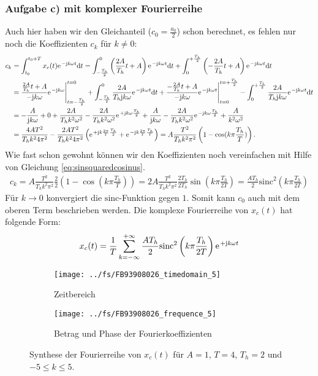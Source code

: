 \documentclass[11pt,a4paper,DIV=12]{scrartcl}
\newcommand{\sinc}{\mathrm{sinc}}
\begin{document}
\subsubsection{Aufgabe c) mit komplexer Fourierreihe}
%
Auch hier haben wir den Gleichanteil ($c_0=\frac{a_0}{2}$) schon berechnet,
es fehlen nur noch die Koeffizienten $c_k$ für $k\neq 0$:
%
%
%
\begin{align}
	c_k&=\int_{t_0}^{t_0+T}x_{c}(t)\e^{-\im k \omega t}\diff t
	=\int_{-\frac{T_h}{2}}^0\left (\frac{2A}{T_h}t+A\right )\e^{-\im k \omega t}\diff t+\int_0^{+\frac{T_h}{2}}\left (-\frac{2A}{T_h}t+A\right )\e^{-\im k \omega t}\diff t\nonumber \\
	&= \frac{\frac{2A}{T_h}t+A}{-\im k \omega}\e^{-\im k \omega}\Bigg|_{t=-\frac{T_h}{2}}^{t=0}+\int_{-\frac{T_h}{2}}^0\frac{2A}{T_h\im k\omega}\e^{-\im k \omega t}\diff t+\frac{-\frac{2A}{T_h}t+A}{-\im k \omega}\e^{-\im k \omega t}\Bigg |_{t=0}^{t=+\frac{T_h}{2}}-\int_0^{+\frac{T_h}{2}}\frac{2A}{T_h\im k\omega}\e^{-\im k \omega t}\diff t\nonumber \\
	&=-\frac{A}{\im k \omega}+0+\frac{2A}{T_h k^2\omega^2}-\frac{2A}{T_hk^2\omega^2}\e^{+\im k \omega \frac{T_h}{2}}+\frac{A}{\im k \omega}-\frac{2A}{T_hk^2\omega^2}\e^{-\im k \omega \frac{T_h}{2}}+\frac{A}{k^2\omega^2}\nonumber \\
	&=\frac{4AT^2}{T_hk^24\pi^2}-\frac{2AT^2}{T_hk^24\pi^2}\left (\e^{+\im k \frac{2\pi}{T}\frac{T_h}{2}}+\e^{-\im k\frac{2\pi}{T}\frac{T_h}{T}}\right )
	=A\frac{T^2}{T_hk^2\pi^2}\left (1-\cos(k\pi\frac{T_h}{T})\right ).
\end{align}
%
%
%
Wie fast schon gewohnt können wir den Koeffizienten noch vereinfachen
mit Hilfe von Gleichung \ref{eq:sinsquaredcosinus}.
%
%
\begin{gather}
	c_k=A\frac{T^2}{T_hk^2\pi^2}\frac{2}{2}\left (1-\cos(k\pi\frac{T_h}{T})\right )
	=2A\frac{T^2}{T_hk^2\pi^2}\frac{2T_h}{2T_h}\sin\left(k\pi\frac{T_h}{2T}\right)
	=\frac{AT_h}{2}\sinc^2\left(k\pi\frac{T_h}{2T}\right)
\end{gather}
%
%
Für $k\rightarrow0$ konvergiert die $\sinc$-Funktion gegen $1$.
%
Somit kann $c_0$ auch mit dem oberen Term beschrieben werden.
%
Die komplexe Fourierreihe von $x_{c}(t)$ hat folgende Form:
%
%
\begin{align}
	x_{c}(t)=\frac{1}{T}\sum_{k=-\infty}^{+\infty}\frac{AT_h}{2}\sinc^2\left(k\pi\frac{T_h}{2T}\right)\e^{+\im k \omega t}
\end{align}
%
%
\begin{figure}
	\centering
	\begin{subfigure}{\textwidth}
		\texttt{[image: ../fs/FB93908026\_timedomain\_5]}
		\caption{Zeitbereich}
	\end{subfigure}
	\begin{subfigure}{\textwidth}
		\texttt{[image: ../fs/FB93908026\_frequence\_5]}
		\caption{Betrag und Phase der Fourierkoeffizienten}
	\end{subfigure}
	\caption{Synthese der Fourierreihe von $x_c(t)$ für $A=1$, $T=4$, $T_h=2$ und
		$-5\leq k\leq5$.}
\end{figure}
\newpage
\end{document}
